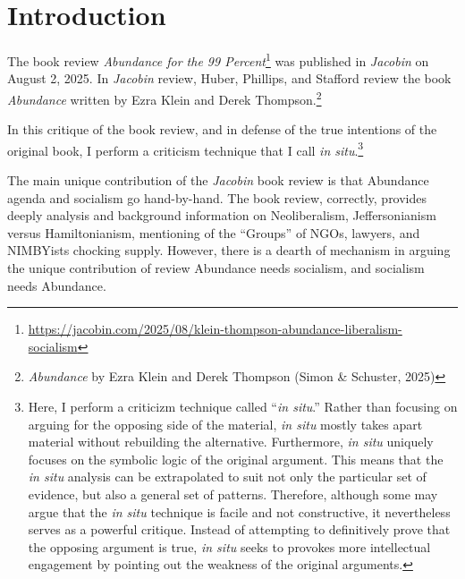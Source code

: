 \documentclass[12pt]{article}
\begin{document}


\section{Introduction}

	The book review \textit{Abundance for the 99 Percent}\footnote{\href{https://jacobin.com/2025/08/klein-thompson-abundance-liberalism-socialism}{https://jacobin.com/2025/08/klein-thompson-abundance-liberalism-socialism}} was published in \textit{Jacobin} on August 2, 2025. In \textit{Jacobin} review, Huber, Phillips, and Stafford review the book \textit{Abundance} written by Ezra Klein and Derek Thompson.\footnote{\textit{Abundance} by Ezra Klein and Derek Thompson (Simon \& Schuster, 2025)}

	In this critique of the book review, and in defense of the true intentions of the original book, I perform a criticism technique that I call \textit{in situ}.\footnote{Here, I perform a criticizm technique called ``\textit{in situ}.'' Rather than focusing on arguing for the opposing side of the material, \textit{in situ} mostly takes apart material without rebuilding the alternative. Furthermore, \textit{in situ} uniquely focuses on the symbolic logic of the original argument. This means that the \textit{in situ} analysis can be extrapolated to suit not only the particular set of evidence, but also a general set of patterns. Therefore, although some may argue that the \textit{in situ} technique is facile and not constructive, it nevertheless serves as a powerful critique. Instead of attempting to definitively prove that the opposing argument is true, \textit{in situ} seeks to provokes more intellectual engagement by pointing out the weakness of the original arguments.}

The main unique contribution of the \textit{Jacobin} book review is that Abundance agenda and socialism go hand-by-hand. The book review, correctly, provides deeply analysis and background information on Neoliberalism, Jeffersonianism versus Hamiltonianism, mentioning of the ``Groups'' of NGOs, lawyers, and NIMBYists chocking supply. However, there is a dearth of mechanism in arguing the unique contribution of review\textemdash{} Abundance needs socialism, and socialism needs Abundance.
\end{document}
